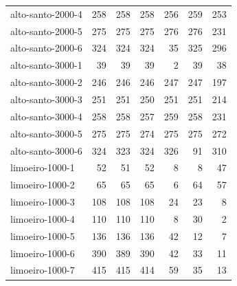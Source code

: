 \begin{table}[ht!]
{\begin{tabular}{lrrrrrr}
			alto-santo-2000-4                                                                       & 258 & 258 & 258 & 256 & 259 & 253 \\
			alto-santo-2000-5                                                                       & 275 & 275 & 275 & 276 & 276 & 231 \\
			alto-santo-2000-6                                                                       & 324 & 324 & 324 & 35  & 325 & 296 \\
			alto-santo-3000-1                                                                       & 39  & 39  & 39  & 2   & 39  & 38  \\
			alto-santo-3000-2                                                                       & 246 & 246 & 246 & 247 & 247 & 197 \\
			alto-santo-3000-3                                                                       & 251 & 251 & 250 & 251 & 251 & 214 \\
			alto-santo-3000-4                                                                       & 258 & 258 & 257 & 259 & 258 & 231 \\
			alto-santo-3000-5                                                                       & 275 & 275 & 274 & 275 & 275 & 272 \\
			alto-santo-3000-6                                                                       & 324 & 323 & 324 & 326 & 91  & 310 \\
			\midrule
			limoeiro-1000-1                                                                         & 52  & 51  & 52  & 8   & 8   & 47  \\
			limoeiro-1000-2                                                                         & 65  & 65  & 65  & 6   & 64  & 57  \\
			limoeiro-1000-3                                                                         & 108 & 108 & 108 & 24  & 23  & 8   \\
			limoeiro-1000-4                                                                         & 110 & 110 & 110 & 8   & 30  & 2   \\
			limoeiro-1000-5                                                                         & 136 & 136 & 136 & 42  & 12  & 7   \\
			limoeiro-1000-6                                                                         & 390 & 389 & 390 & 42  & 33  & 11  \\
			limoeiro-1000-7                                                                         & 415 & 415 & 414 & 59  & 35  & 13  \\

\end{tabular}}
\end{table}
